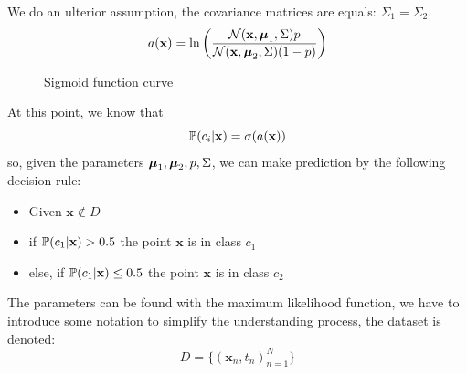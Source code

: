 \documentclass[10pt, letterpaper]{report}
\begin{document}
We do an ulterior assumption, the covariance matrices are equals: $\Sigma_1=\Sigma_2$.
\begin{equation}
    a(\mathbf x)=
\ln\left(\frac{\mathcal N(\mathbf x,{\boldsymbol{\mu}}_1,\Sigma)p}{\mathcal N(\mathbf x,{\boldsymbol{\mu}}_2,\Sigma)(1-p)}\right)
\end{equation}
\begin{figure}[h!]
    \centering
    \caption{Sigmoid function curve}
\end{figure}
At this point, we know that
\begin{equation}
    {\mathbb P}(c_i|\mathbf x)=\sigma(a(\mathbf x))
\end{equation}
so, given the parameters ${\boldsymbol{\mu}}_1,{\boldsymbol{\mu}}_2,p,\Sigma$, we can make prediction by the following decision rule:\begin{itemize}
    \item Given $\mathbf x\notin D$
    \item if ${\mathbb P}(c_1|\mathbf x)>0.5$ the point $\mathbf x$ is in class $c_1$
    \item else, if ${\mathbb P}(c_1|\mathbf x)\le0.5$ the point $\mathbf x$ is in class $c_2$
\end{itemize}
The parameters can be found with the maximum likelihood function, we have to introduce some notation to simplify the understanding process, the dataset is denoted:\begin{equation}
D=\{(\mathbf x_n,t_n)_{n=1}^N\}
\end{equation}
\end{document}
